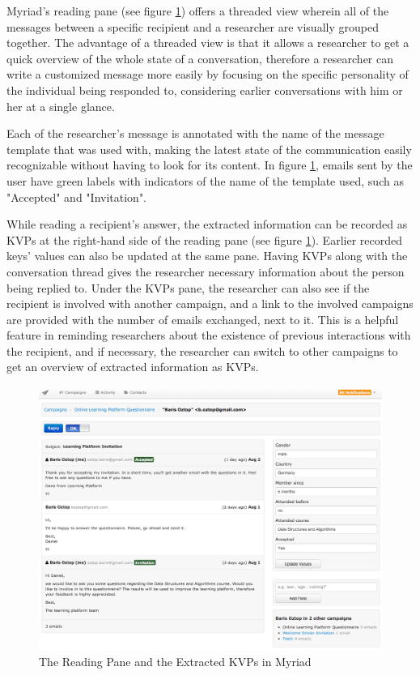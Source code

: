 Myriad's reading pane (see figure \ref{fig:MyriadReadingPane}) offers a threaded view wherein all of the messages between a specific recipient and a researcher are visually grouped together. The advantage of a threaded view is that it allows a researcher to get a quick overview of the whole state of a conversation, therefore a researcher can write a customized message more easily by focusing on the specific personality of the individual being responded to, considering earlier conversations with him or her at a single glance.
\vspace{1cm}

Each of the researcher's message is annotated with the name of the message template that was used with, making the latest state of the communication easily recognizable without having to look for its content. In figure \ref{fig:MyriadReadingPane}, emails sent by the user have green labels with indicators of the name of the template used, such as "Accepted" and "Invitation".
\vspace{1cm}

While reading a recipient's answer, the extracted information can be recorded as \ac{KVP}s at the right-hand side of the reading pane (see figure \ref{fig:MyriadReadingPane}). Earlier recorded keys' values can also be updated at the same pane. Having \ac{KVP}s along with the conversation thread gives the researcher necessary information about the person being replied to. Under the \ac{KVP}s pane, the researcher can also see if the recipient is involved with another campaign, and a link to the involved campaigns are provided with the number of emails exchanged, next to it. This is a helpful feature in reminding researchers about the existence of previous interactions with the recipient, and if necessary, the researcher can switch to other campaigns to get an overview of extracted information as \ac{KVP}s.

\begin{figure}[htbp]
	\centering
	\includegraphics[width=1.00\textwidth]{imgs/MyriadReadingPane.png}
	\caption[The Reading Pane and the Extracted \ac{KVP}s in Myriad]{The Reading Pane and the Extracted \ac{KVP}s in Myriad}
	\label{fig:MyriadReadingPane}
\end{figure}

